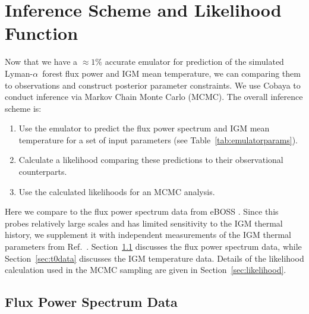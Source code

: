 \documentclass[a4paper,11pt]{article}
\newcommand{\lya}{Lyman-$\alpha$\ }
\begin{document}

\section{Inference Scheme and Likelihood Function}\label{sec:inference}

Now that we have a $\approx1\%$ accurate emulator for prediction of the simulated \lya forest flux power and IGM mean temperature, we can comparing them to observations and construct posterior parameter constraints.
We use Cobaya \cite{2021JCAP...05..057T, 2019ascl.soft10019T} to conduct inference via Markov Chain Monte Carlo (MCMC).
The overall inference scheme is:
\begin{enumerate}
    \item Use the emulator to predict the flux power spectrum and IGM mean temperature for a set of input parameters (see Table~\ref{tab:emulatorparams}).
    \item Calculate a likelihood comparing these predictions to their observational counterparts.
    \item Use the calculated likelihoods for an MCMC analysis.
\end{enumerate}

Here we compare to the flux power spectrum data from eBOSS \cite{2019JCAP...07..017C}. Since this probes relatively large scales and has limited sensitivity to the IGM thermal history, we supplement it with independent measurements of the IGM thermal parameters from Ref.~\cite{2021MNRAS.506.4389G}. Section~\ref{sec:fpsdata} discusses the flux power spectrum data, while Section~\ref{sec:t0data} discusses the IGM temperature data. Details of the likelihood calculation used in the MCMC sampling are given in Section~\ref{sec:likelihood}.


\subsection{Flux Power Spectrum Data}\label{sec:fpsdata}
\end{document}
